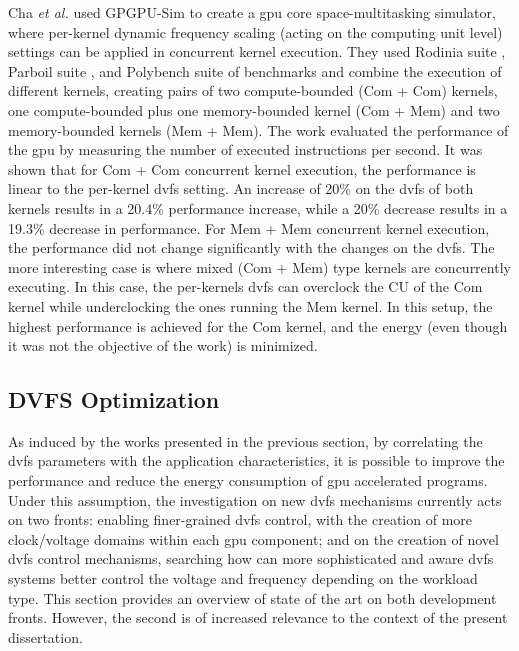Cha \textit{et al.} \cite{cha_core-level_2018} used GPGPU-Sim to create a \acrshort{gpu} core space-multitasking simulator, where per-kernel dynamic frequency scaling (acting on the computing unit level) settings can be applied in concurrent kernel execution. They used Rodinia suite \cite{che_rodinia:_2009}, Parboil suite \cite{stratton_parboil:_nodate}, and Polybench suite \cite{noauthor_polybench/c_nodate} of benchmarks and combine the execution of different kernels, creating pairs of two compute-bounded (Com + Com) kernels, one compute-bounded plus one memory-bounded kernel (Com + Mem) and two memory-bounded kernels (Mem + Mem). The work evaluated the performance of the \acrshort{gpu} by measuring the number of executed instructions per second. It was shown that for Com + Com concurrent kernel execution, the performance is linear to the per-kernel \acrshort{dvfs} setting. An increase of 20\% on the \acrshort{dvfs} of both kernels results in a 20.4\% performance increase, while a 20\% decrease results in a 19.3\% decrease in performance. For Mem + Mem concurrent kernel execution, the performance did not change significantly with the changes on the \acrshort{dvfs}. The more interesting case is where mixed (Com + Mem) type kernels are concurrently executing. In this case, the per-kernels \acrshort{dvfs} can overclock the CU of the Com kernel while underclocking the ones running the Mem kernel. In this setup, the highest performance is achieved for the Com kernel, and the energy (even though it was not the objective of the work) is minimized.

\subsection{DVFS Optimization}
\label{section:DVFS_opt}

As induced by the works presented in the previous section, by correlating the \acrshort{dvfs} parameters with the application characteristics, it is possible to improve the performance and reduce the energy consumption of \acrshort{gpu} accelerated programs. Under this assumption, the investigation on new \acrshort{dvfs} mechanisms currently acts on two fronts: enabling finer-grained \acrshort{dvfs} control, with the creation of more clock/voltage domains within each \acrshort{gpu} component; and on the creation of novel \acrshort{dvfs} control mechanisms, searching how can more sophisticated and aware \acrshort{dvfs} systems better control the voltage and frequency depending on the workload type. This section provides an overview of state of the art on both development fronts. However, the second is of increased relevance to the context of the present dissertation.

